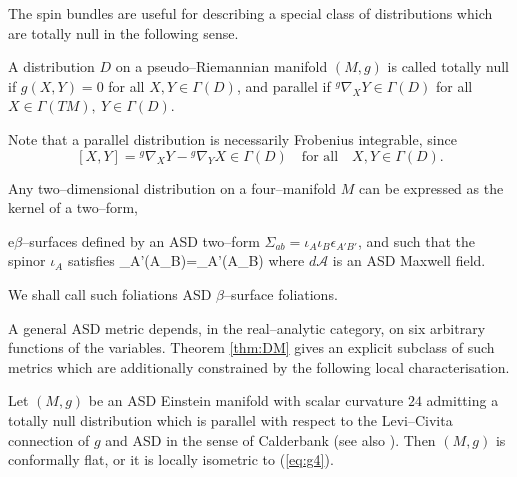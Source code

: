 The spin bundles are useful for describing a special class of distributions which are totally null in the following sense.

\begin{defi}
A distribution $D$ on a pseudo--Riemannian manifold $(M,g)$ is called totally null if $g(X,Y)=0$ for all $X,Y\in\Gamma(D)$, and parallel if $^g\nabla_XY\in\Gamma(D)$ for all $X\in \Gamma(TM),\ Y\in\Gamma(D)$.
\end{defi}
Note that a parallel distribution is necessarily Frobenius integrable, since
\[
[X,Y]= {^g}\nabla_XY- {^g}\nabla_YX\in\Gamma(D)\quad\mbox{for all}\quad X,Y\in\Gamma(D).
\]

Any two--dimensional distribution on a four--manifold $M$ can be expressed as the kernel of a two--form, 

e$\beta$--surfaces defined by an ASD two--form
$\Sigma_{ab}=\iota_A\iota_B\epsilon_{A'B'}$, and  such that
the spinor $\iota_A$ satisfies
\be
\label{dm3}
\nabla_{A'(A}\iota_{B)}=_{A'(A}\iota_{B)}
\ee
where $d\mathcal{A}$ is an ASD Maxwell field.

We shall call such foliations ASD $\beta$--surface foliations. 

A general ASD metric depends, in the real--analytic category, on six arbitrary functions of the variables. Theorem \ref{thm:DM} gives an explicit subclass of such metrics which are additionally constrained by the following local characterisation.

\begin{theo}\cite{DM} \label{thm:DMcharacterisation}
Let $(M,g)$ be an ASD Einstein manifold with scalar curvature $24$ admitting a totally null distribution which is parallel with respect to the Levi--Civita connection of $g$ and ASD in the sense of Calderbank \cite{Cal1} (see also \cite{West}). Then $(M,g)$ is conformally flat, or it is locally isometric to (\ref{eq:g4}).
\end{theo}

